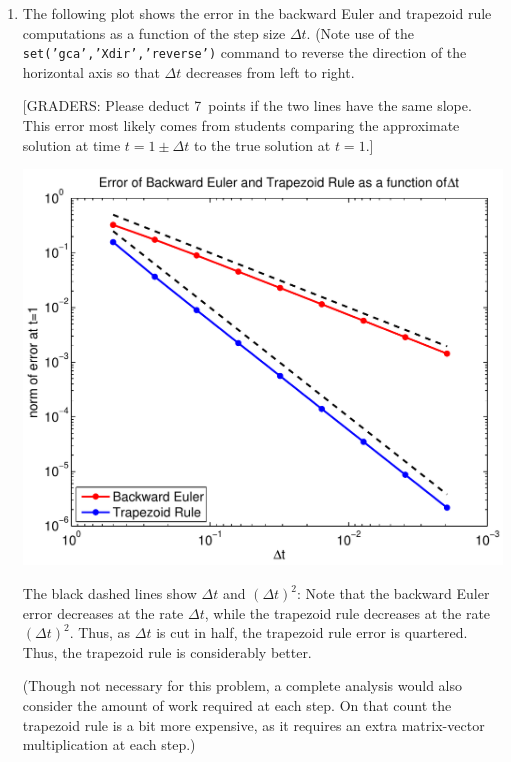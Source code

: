 {\begin{solution}
\begin{enumerate}
      

\item The following plot shows the error in the backward Euler and trapezoid rule
      computations as a function of the step size $\Delta t$.  (Note use of the
         {\tt set('gca','Xdir','reverse')} command to reverse the direction of the
          horizontal axis so that $\Delta t$ decreases from left to right.

      [GRADERS: Please deduct 7~points if the two lines have the same slope.
      This error most likely comes from students comparing the approximate 
      solution at time $t=1\pm \Delta t$ to the true solution at $t=1$.]

      \begin{center} \includegraphics[scale=0.5]{traprule2}\end{center}

      The black dashed lines show $\Delta t$ and $(\Delta t)^2$:  Note that
      the backward Euler error decreases at the rate $\Delta t$, while
      the trapezoid rule decreases at the rate $(\Delta t)^2$.
      Thus, as $\Delta t$ is cut in half, the trapezoid rule error is
      quartered.  Thus, the trapezoid rule is considerably better.

      (Though not necessary for this problem, a complete analysis would
       also consider the amount of work required at each step.
       On that count the trapezoid rule is a bit more expensive,
         as it requires an extra matrix-vector multiplication at each step.)


\end{enumerate}
\end{solution}}
